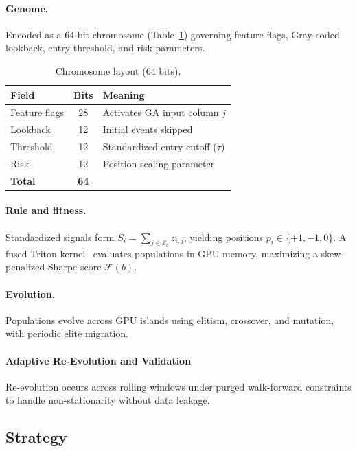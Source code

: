 \documentclass[11pt,letterpaper]{article}
\begin{document}
\paragraph{Genome.} Encoded as a 64-bit chromosome (Table~\ref{tab:genome}) governing feature flags, Gray-coded lookback, entry threshold, and risk parameters.
 
\begin{table}[!htb]
\centering
\caption{Chromosome layout (64 bits).}
\label{tab:genome}
\small
\begin{tabular}{@{}lcl@{}}
\toprule
\textbf{Field} & \textbf{Bits} & \textbf{Meaning} \\
\midrule
Feature flags & 28 & Activates GA input column $j$ \\
Lookback & 12 & Initial events skipped \\
Threshold & 12 & Standardized entry cutoff ($\tau$) \\
Risk & 12 & Position scaling parameter \\
\midrule
\textbf{Total} & \textbf{64} & \\
\bottomrule
\end{tabular}
\end{table}
 
\paragraph{Rule and fitness.} Standardized signals form $S_i = \sum_{j\in\mathcal{S}_b} z_{i,j}$, yielding positions $p_i \in \{+1, -1, 0\}$. A fused Triton kernel~\cite{tillet2019triton} evaluates populations in GPU memory, maximizing a skew-penalized Sharpe score $\mathcal{F}(b)$.
 
\paragraph{Evolution.} Populations evolve across GPU islands using elitism, crossover, and mutation, with periodic elite migration.
 
\paragraph{Adaptive Re-Evolution and Validation} Re-evolution occurs across rolling windows under purged walk-forward constraints to handle non-stationarity without data leakage.

\subsection{Strategy}
\end{document}

